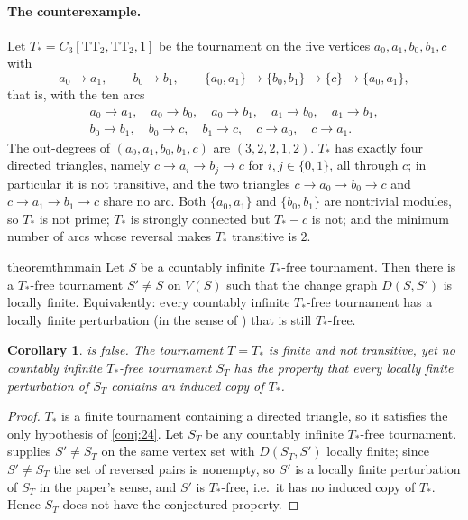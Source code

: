 \documentclass[11pt,a4paper]{article}
\theoremstyle{plain}
\newtheorem{corollary}[theorem]{Corollary}
\theoremstyle{definition}
\theoremstyle{remark}
\newcommand{\Tstar}{T_{\ast}}
\newcommand{\TT}{\mathrm{TT}}
\begin{document}
\paragraph{The counterexample.}
Let $\Tstar=C_3[\TT_2,\TT_2,1]$ be the tournament on the five vertices $a_0,a_1,b_0,b_1,c$ with
\[
 a_0\to a_1,\qquad b_0\to b_1,\qquad \{a_0,a_1\}\to\{b_0,b_1\}\to\{c\}\to\{a_0,a_1\},
\]
that is, with the ten arcs
\begin{gather*}
 a_0\to a_1,\quad a_0\to b_0,\quad a_0\to b_1,\quad a_1\to b_0,\quad a_1\to b_1,\\
 b_0\to b_1,\quad b_0\to c,\quad b_1\to c,\quad c\to a_0,\quad c\to a_1 .
\end{gather*}
The out-degrees of $(a_0,a_1,b_0,b_1,c)$ are $(3,2,2,1,2)$. $\Tstar$ has exactly four directed triangles, namely $c\to a_i\to b_j\to c$ for $i,j\in\{0,1\}$, all through $c$; in particular it is not transitive, and the two triangles $c\to a_0\to b_0\to c$ and $c\to a_1\to b_1\to c$ share no arc. Both $\{a_0,a_1\}$ and $\{b_0,b_1\}$ are nontrivial modules, so $\Tstar$ is not prime; $\Tstar$ is strongly connected but $\Tstar-c$ is not; and the minimum number of arcs whose reversal makes $\Tstar$ transitive is $2$.

\begin{restatable}{theorem}{thmmain}\label{thm:main}
Let $S$ be a countably infinite $\Tstar$-free tournament. Then there is a $\Tstar$-free tournament $S'\ne S$ on $V(S)$ such that the change graph $D(S,S')$ is locally finite. Equivalently: every countably infinite $\Tstar$-free tournament has a locally finite perturbation (in the sense of \cite{BGJMS25}) that is still $\Tstar$-free.
\end{restatable}

\begin{corollary}\label{cor:main}
 is false. The tournament $T=\Tstar$ is finite and not transitive, yet no countably infinite $\Tstar$-free tournament $S_{T}$ has the property that every locally finite perturbation of $S_T$ contains an induced copy of $\Tstar$.
\end{corollary}
\begin{proof}
$\Tstar$ is a finite tournament containing a directed triangle, so it satisfies the only hypothesis of \cref{conj:24}. Let $S_T$ be any countably infinite $\Tstar$-free tournament.  supplies $S'\ne S_T$ on the same vertex set with $D(S_T,S')$ locally finite; since $S'\ne S_T$ the set of reversed pairs is nonempty, so $S'$ is a locally finite perturbation of $S_T$ in the paper's sense, and $S'$ is $\Tstar$-free, i.e.\ it has no induced copy of $\Tstar$. Hence $S_T$ does not have the conjectured property.
\end{proof}
\end{document}
